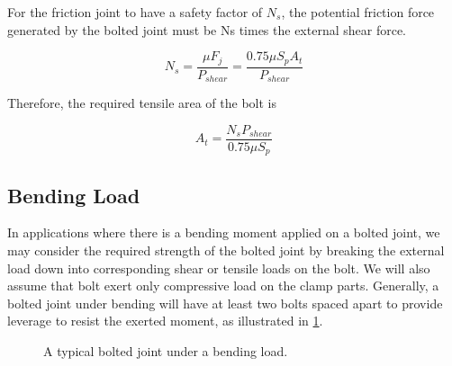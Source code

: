 \documentclass[
10pt,
a4paper,
openany,
svgnames,
]{book}
\begin{document}
For the friction joint to have a safety factor of $N_s$, the potential friction force generated by the bolted joint must be Ns times the external shear force.

\begin{equation}
  N_s = \frac{\mu F_j}{P_{shear}} = \frac{0.75\mu S_pA_t}{P_{shear}}
\end{equation}

Therefore, the required tensile area of the bolt is

\begin{equation}
  \label{eqn: req bolt area of shear load}
  A_t = \frac{N_s P_{shear}}{0.75\mu S_p}
\end{equation}

\subsection{Bending Load}

In applications where there is a bending moment applied on a bolted joint, we may consider the required strength of the bolted joint by breaking the external load down into corresponding shear or tensile loads on the bolt. We will also assume that bolt exert only compressive load on the clamp parts. Generally, a bolted joint under bending will have at least two bolts spaced apart to provide leverage to resist the exerted moment, as illustrated in \cref{fig: bolted joint under bending}.

\begin{figure}[h]
  \centering
  \caption{A typical bolted joint under a bending load.}
  \label{fig: bolted joint under bending}
\end{figure}
\end{document}
